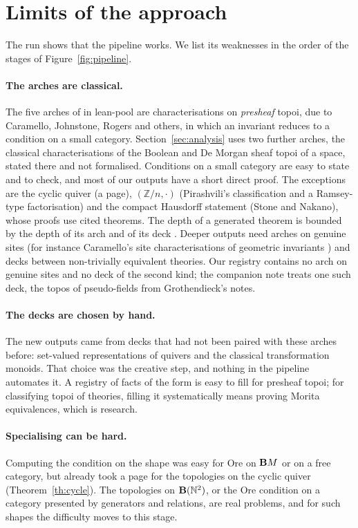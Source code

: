 \section{Limits of the approach}\label{sec:limits}

The run shows that the pipeline works. We list its weaknesses in the order of the stages of Figure~\ref{fig:pipeline}.

\paragraph{The arches are classical.} The five arches of \lp{} in lean-pool are characterisations on \emph{presheaf} topoi, due to Caramello, Johnstone, Rogers and others, in which an invariant reduces to a condition on a small category. Section~\ref{sec:analysis} uses two further arches, the classical characterisations of the Boolean and De Morgan sheaf topoi of a space, stated there and not formalised. Conditions on a small category are easy to state and to check, and most of our outputs have a short direct proof. The exceptions are the cyclic quiver (a page), $(\mathbb Z/n,\cdot)$ (Pirashvili's classification and a Ramsey-type factorisation) and the compact Hausdorff statement (Stone and Nakano), whose proofs use cited theorems. The depth of a generated theorem is bounded by the depth of its arch and of its deck \cite[slide 8]{caramello-mines}. Deeper outputs need arches on genuine sites (for instance Caramello's site characterisations of geometric invariants \cite{caramello-tst}) and decks between non-trivially equivalent theories. Our registry contains no arch on genuine sites and no deck of the second kind; the companion note \cite{bridges-notes} treats one such deck, the topos of pseudo-fields from Grothendieck's notes.

\paragraph{The decks are chosen by hand.} The new outputs came from decks that had not been paired with these arches before: set-valued representations of quivers and the classical transformation monoids. That choice was the creative step, and nothing in the pipeline automates it. A registry of facts of the form  is easy to fill for presheaf topoi; for classifying topoi of theories, filling it systematically means proving Morita equivalences, which is research.

\paragraph{Specialising can be hard.} Computing the condition on the shape was easy for Ore on $\mathbf{B} M$ or on a free category, but already took a page for the topologies on the cyclic quiver (Theorem~\ref{th:cycle}). The topologies on $\mathbf{B}(\mathbb N^2)$, or the Ore condition on a category presented by generators and relations, are real problems, and for such shapes the difficulty moves to this stage.

